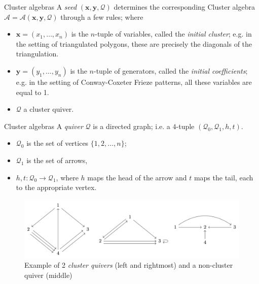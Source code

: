 \documentclass{beamer}
\begin{document}

\begin{frame}{Cluster algebras}
     A \emph{seed} $(\mathbf{x},\mathbf{y},\mathcal{Q})$ determines the corresponding Cluster algebra $\mathcal{A} = \mathcal{A}(\mathbf{x},\mathbf{y},\mathcal{Q})$ through a few rules; where
     \pause
    \begin{itemize}
        \item $\mathbf{x}=(x_1,\dots,x_n)$ is the   $n$-tuple of variables, called the \emph{initial cluster}; e.g. in the setting of triangulated polygons, these are precisely the diagonals of the triangulation.
        \pause
        \item $\mathbf{y}=(y_1,\dots,y_n)$ is the $n$-tuple of generators, called the \emph{initial coefficients}; e.g. in the setting of Conway-Coxeter Frieze patterns, all these variables are equal to 1. 
        \pause
        \item $\mathcal{Q}$ a cluster quiver.
    \end{itemize}
\end{frame}

\begin{frame}{Cluster algebras}
    A \emph{quiver} $\mathcal{Q}$ is a directed graph; i.e. a $4$-tuple $(\mathcal{Q}_0, \mathcal{Q}_1, h, t)$.
    \begin{itemize}
        \item $\mathcal{Q}_0$ is the set of vertices $\{1,2,\dots, n\}$; \pause
        \item $\mathcal{Q}_1$ is the set of arrows,\pause
        \item $h,t : \mathcal{Q}_0 \to \mathcal{Q}_1$, where $h$ maps the head of the arrow and $t$ maps the tail, each to the appropriate vertex.
    \end{itemize}
    \pause
\begin{figure}[H]
    \centering
    \includegraphics[width = 11 cm]{Images/quivers.png}
    \caption{Example of 2 \emph{cluster quivers} (left and rightmost) and a non-cluster quiver (middle)}
    \label{fig:my_label}
\end{figure}
\end{frame}
\end{document}
